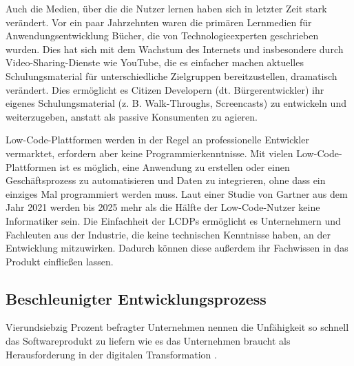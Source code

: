 \documentclass[12pt]{article} %
\begin{document}
	Auch die Medien, über die die Nutzer lernen haben sich in letzter Zeit stark verändert. Vor ein paar Jahrzehnten waren die primären Lernmedien für Anwendungsentwicklung Bücher, die von Technologieexperten geschrieben wurden. Dies hat sich mit dem Wachstum des Internets und insbesondere durch Video-Sharing-Dienste wie YouTube, die es einfacher machen aktuelles Schulungsmaterial für unterschiedliche Zielgruppen bereitzustellen, dramatisch verändert.
	Dies ermöglicht es Citizen Developern (dt. Bürgerentwickler) ihr eigenes Schulungsmaterial (z. B. Walk-Throughs, Screencasts) zu entwickeln und weiterzugeben, anstatt als passive Konsumenten zu agieren. \cite{DiRuscio.2022}
	
	Low-Code-Plattformen werden in der Regel an professionelle Entwickler vermarktet, erfordern aber keine Programmierkenntnisse. Mit vielen Low-Code-Plattformen ist es möglich, eine Anwendung zu erstellen oder einen Geschäftsprozess zu automatisieren und Daten zu integrieren, ohne dass ein einziges Mal programmiert werden muss. \cite{MichelleGardner.2022} Laut einer Studie von Gartner aus dem Jahr 2021 werden bis 2025 mehr als die Hälfte der Low-Code-Nutzer keine Informatiker sein. Die Einfachheit der LCDPs ermöglicht es Unternehmern und Fachleuten aus der Industrie, die keine technischen Kenntnisse haben, an der Entwicklung mitzuwirken. Dadurch können diese außerdem ihr Fachwissen in das Produkt einfließen lassen. \cite{OleksiiGlib.2022}
		
	
	\subsection{Beschleunigter Entwicklungsprozess}	\label{faster}
	Vierundsiebzig Prozent befragter Unternehmen nennen die Unfähigkeit so schnell das Softwareprodukt zu liefern wie es das Unternehmen braucht als Herausforderung in der digitalen Transformation \cite{EmmaVanPelt.2019}. \newline %
	
\end{document}
